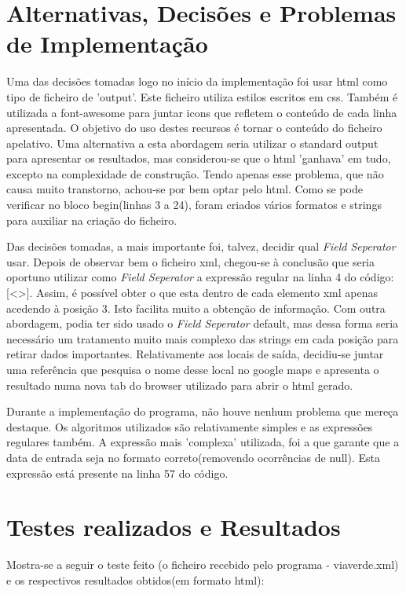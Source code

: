 \documentclass{report}
\def\fs{\emph{Field Seperator}\xspace}
\begin{document}
\section{Alternativas, Decisões e Problemas de Implementação}
Uma das decisões tomadas logo no início da implementação foi usar html como tipo de ficheiro de 'output'.
Este ficheiro utiliza estilos escritos em css. 
Também é utilizada a font-awesome para juntar icons que refletem o conteúdo de cada linha apresentada. 
O objetivo do uso destes recursos é tornar o conteúdo do ficheiro apelativo.
Uma alternativa a esta abordagem seria utilizar o standard output para
apresentar os resultados, mas considerou-se que o html 'ganhava' em tudo, 
excepto na complexidade de construção. Tendo apenas esse problema, que não
causa muito transtorno, achou-se por bem optar pelo html.
Como se pode verificar no bloco begin(linhas 3 a 24), foram criados vários formatos e strings para auxiliar na criação do ficheiro.\par
Das decisões tomadas, a mais importante foi, talvez, decidir qual \fs usar. Depois de observar bem o ficheiro xml, chegou-se à 
conclusão que seria oportuno utilizar como \fs a expressão regular na linha 4 do código: [\textless\textgreater]. Assim, é possível obter o que esta dentro de cada elemento xml apenas acedendo à posição 3. Isto facilita muito a obtenção de informação.
Com outra abordagem, podia ter sido usado o \fs default, mas dessa
forma seria necessário um tratamento muito mais complexo das strings
em cada posição para retirar dados importantes. 
Relativamente aos locais de saída, decidiu-se juntar uma referência que pesquisa o nome desse local no google maps e apresenta o resultado
numa nova tab do browser utilizado para abrir o html gerado. \par
Durante a implementação do programa, não houve nenhum problema que mereça 
destaque. Os algoritmos utilizados são relativamente simples e as 
expressões regulares também. A expressão mais 'complexa' utilizada, foi a 
que garante que a data de entrada seja no formato correto(removendo ocorrências de null). Esta expressão está presente na linha 57 do código.


\section{Testes realizados e Resultados}
Mostra-se a seguir o teste feito (o ficheiro recebido pelo programa - 
viaverde.xml) e os respectivos resultados obtidos(em formato html):
\end{document}
